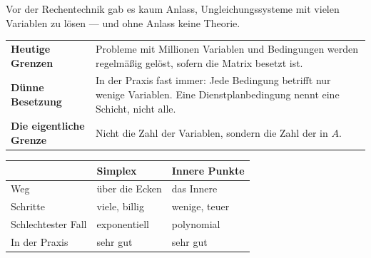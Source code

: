 \begin{geschichte}
Vor der Rechentechnik gab es kaum Anlass, Ungleichungssysteme mit vielen Variablen zu lösen --- und ohne Anlass keine Theorie.

\begin{center}
\begin{minipage}{0.9\textwidth}
\end{minipage}
\end{center}
\end{geschichte}

\begin{forschung}
\begin{center}
{\small
\renewcommand{\arraystretch}{1.45}
\begin{tabular}{@{}P{2.8cm}P{5.4cm}@{}}
\toprule
\textbf{Heutige Grenzen} & Probleme mit Millionen Variablen und Bedingungen werden regelmäßig gelöst, sofern die Matrix  besetzt ist.\\
\textbf{Dünne Besetzung} & In der Praxis fast immer: Jede Bedingung betrifft nur wenige Variablen. Eine Dienstplanbedingung nennt eine Schicht, nicht alle.\\
\textbf{Die eigentliche Grenze} & Nicht die Zahl der Variablen, sondern die Zahl der  in $A$.\\
\bottomrule
\end{tabular}}
\end{center}

\begin{center}
\begin{minipage}{0.88\textwidth}
\end{minipage}
\end{center}

\begin{center}
{\small
\renewcommand{\arraystretch}{1.45}
\begin{tabular}{@{}P{2.4cm}P{2.8cm}P{2.8cm}@{}}
\toprule
& \textbf{Simplex} & \textbf{Innere Punkte}\\
\midrule
Weg & über die Ecken &  das Innere\\
Schritte & viele, billig & wenige, teuer\\
Schlechtester Fall & \textcolor{akzent}{exponentiell} & \textcolor{gruen}{polynomial}\\
In der Praxis & \textcolor{gruen}{sehr gut} & \textcolor{gruen}{sehr gut}\\
\bottomrule
\end{tabular}}
\end{center}


\end{forschung}
